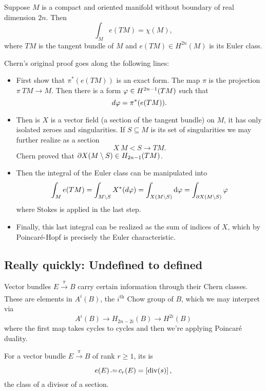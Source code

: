\documentclass[12pt]{memoir}
\begin{document}
\begin{Th}
Suppose $M$ is a compact and oriented manifold without boundary of real dimension $2n$. Then 
$$\int_Me(TM)=\chi(M),$$
where $TM$ is the tangent bundle of $M$ and $e(TM)\in H^{2n}(M)$ is its Euler class.
\end{Th}

Chern's original proof goes along the following lines:
\begin{itemize}
    \item First show that $\pi^\ast(e(TM))$ is an exact form. The map $\pi$ is the projection $\pi\: TM\to M$. Then there is a form $\varphi\in H^{2n-1}(TM)$ such that 
    $$d\varphi=\pi^\ast(e(TM)).$$
    \item Then is $X$ is a vector field (a section of the tangent bundle) on $M$, it has only isolated zeroes and singularities. If $S\subseteq M$ is its set of singularities we may further realize as a section
    $$X\:M\less S\to TM.$$
    Chern proved that $\partial X(M\setminus S)\in H_{2n-1}(TM)$.
    \item Then the integral of the Euler class can be manipulated into
    $$\int_Me(TM)=\int_{M\setminus S}X^\ast(d\varphi)=\int_{X(M\setminus S)}\dd\varphi=\int_{\partial X(M\setminus S)}\varphi$$
    where Stokes is applied in the last step.
    \item Finally, this last integral can be realized as the sum of indices of $X$, which by Poincaré-Hopf is precisely the Euler characteristic.
\end{itemize}

\subsection{Really quickly: Undefined to defined}

Vector bundles $E\xrightarrow[]{\pi}B$ carry certain information through their Chern classes. These are elements in $A^i(B)$, the $i^{\text{th}}$ Chow group of $B$, which we may interpret via
$$A^i(B)\to H_{2n-2i}(B)\to H^{2i}(B)$$
where the first map takes cycles to cycles and then we're applying Poincaré duality.

\begin{Def}
    For a vector bundle $E\xrightarrow[]{\pi}B$ of rank $r\geq 1$, its  is
    $$e(E)\defeq c_r(E)=\bonj{\div(s)},$$
    the class of a divisor of a section. 
\end{Def}
\end{document}
